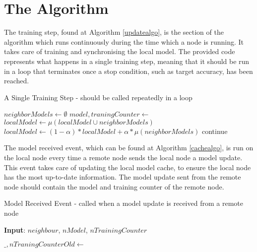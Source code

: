 \section{The Algorithm}
The training step, found at Algorithm \ref{updatealgo}, is the section of the algorithm which runs continuously during the time which a node is running. It takes care of training and synchronising the local model. The provided code represents what happens in a single training step, meaning that it should be run in a loop that terminates once a stop condition, such as target accuracy, has been reached.

\begin{algorithm}[H]
	\caption{A Single Training Step - should be called repeatedly in a loop} \label{updatealgo}
	\begin{algorithmic}[1]
		\State {}
		\State {}
		\EndFor
		
		\State $neighborModels \gets \emptyset$
		\State $model, traningCounter \gets$ 
		\State {}
		\EndIf
		\EndFor
		\State $localModel \gets \mu(localModel \cup neighborModels)$
		\State $localModel \gets (1 - \alpha) * localModel + \alpha * \mu(neighborModels)$
		\EndIf
		\Else
		\State continue
		\EndIf
		\State {}
		\EndFor
	\end{algorithmic}
\end{algorithm}

The model received event, which can be found at Algorithm \ref{cachealgo}, is run on the local node every time a remote node sends the local node a model update. This event takes care of updating the local model cache, to ensure the local node has the most up-to-date information. The model update sent from the remote node should contain the model and training counter of the remote node.

\begin{algorithm}[H]
	\caption{Model Received Event - called when a model update is received from a remote node} \label{cachealgo}
	\textbf{Input}: $neighbour$, $nModel$, $nTrainingCounter$
	\newline
	\begin{algorithmic}[1]
		\State $\_, nTraningCounterOld \gets$ 
		\State {}
		\EndIf
		\Else
		\State {}
		\EndIf
	\end{algorithmic}
\end{algorithm}

